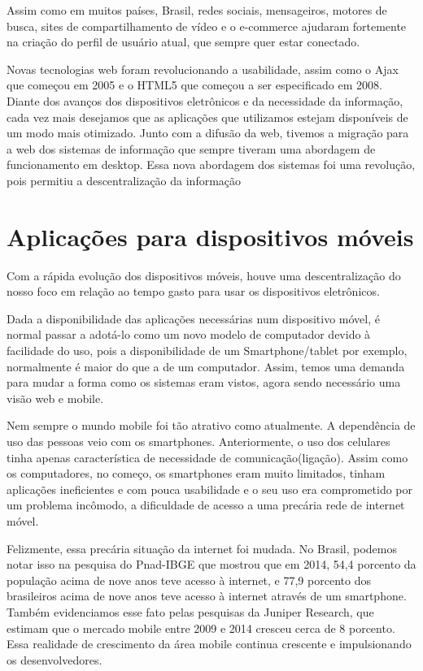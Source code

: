 Assim como em muitos países, Brasil, redes sociais, mensageiros, motores de busca, sites de compartilhamento de vídeo e o e-commerce ajudaram fortemente na criação do perfil de usuário atual, que sempre quer estar conectado. 


Novas tecnologias web foram revolucionando a usabilidade, assim como o Ajax que começou em 2005 e o HTML5 que começou a ser especificado em 2008. Diante dos avanços dos dispositivos eletrônicos e da necessidade da informação, cada vez mais desejamos que as aplicações que utilizamos estejam disponíveis de um modo mais otimizado. Junto com a difusão da web, tivemos a migração para a web dos sistemas de informação que sempre tiveram uma abordagem de funcionamento em desktop. Essa nova abordagem dos sistemas foi uma revolução, pois permitiu a descentralização da informação


\section{Aplicações para dispositivos móveis}


Com a rápida evolução dos dispositivos móveis, houve uma descentralização do nosso foco em relação ao tempo gasto para usar os dispositivos eletrônicos.


Dada a disponibilidade das aplicações necessárias num dispositivo móvel, é normal passar a adotá-lo como um novo modelo de computador devido à facilidade do uso, pois a disponibilidade de um Smartphone/tablet por exemplo, normalmente é maior do que a de um computador. Assim, temos uma demanda para mudar a forma como os sistemas eram vistos, agora sendo necessário uma visão web e mobile.


Nem sempre o mundo mobile foi tão atrativo como atualmente. A dependência de uso das pessoas veio com os smartphones. Anteriormente, o uso dos celulares tinha apenas característica de necessidade de comunicação(ligação). Assim como os computadores, no começo, os smartphones eram muito limitados, tinham aplicações ineficientes e com pouca usabilidade e o seu uso era comprometido por um problema incômodo, a dificuldade de acesso a uma precária rede de internet móvel.


Felizmente, essa precária situação da internet foi mudada. No Brasil, podemos notar isso na pesquisa do Pnad-IBGE que mostrou que em 2014, 54,4 porcento da população acima de nove anos teve acesso à internet, e 77,9 porcento dos brasileiros acima de nove anos teve acesso à internet através de um smartphone. Também evidenciamos esse fato pelas pesquisas da Juniper Research, que estimam que o mercado mobile entre 2009 e 2014 cresceu cerca de 8 porcento. Essa realidade de crescimento da área mobile continua crescente e impulsionando os desenvolvedores. 


